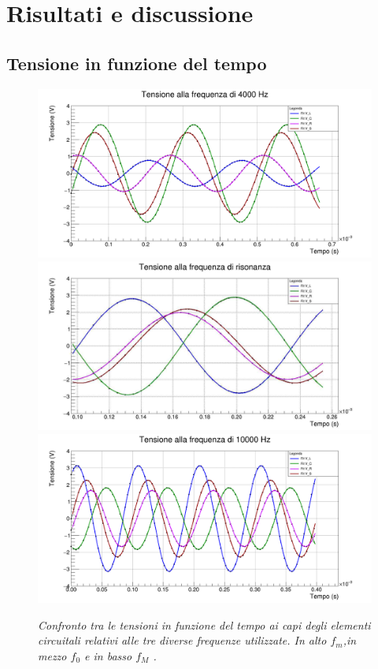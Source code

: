 \documentclass{article}
\begin{document}
\section{Risultati e discussione}
\subsection{Tensione in funzione del tempo}
\begin{figure}[]
  \centering
  \includegraphics[scale=0.27]{FitFMin.png}
  \qquad
  \includegraphics[scale=0.27]{FitF0.jpg}
  \qquad
  \includegraphics[scale=0.27]{FitFMag.png}
  \caption{\textit{Confronto tra le tensioni in funzione del tempo ai capi degli elementi circuitali relativi alle tre diverse frequenze utilizzate. In alto $f_m$,in mezzo $f_0$ e in basso $f_M$ .}}
\end{figure}
\end{document}
